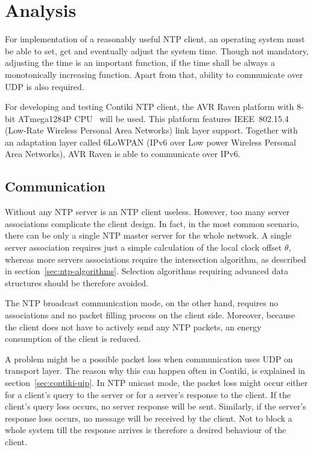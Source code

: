 
\chapter{Analysis}
For implementation of a reasonably useful NTP client,
an operating system must be able to set, get and eventually adjust the system time.
Though not mandatory, adjusting the time is an important function,
if the time shall be always a monotonically increasing function.
Apart from that, ability to communicate over UDP is also required.

For developing and testing Contiki NTP client,
the AVR Raven platform with 8-bit ATmega1284P CPU~\cite{avr-datasheet} will be used.
This platform features IEEE~802.15.4 (Low-Rate Wireless Personal Area Networks) link layer support.
Together with an adaptation layer called 6LoWPAN (IPv6 over Low power Wireless Personal Area Networks),
AVR Raven is able to communicate over IPv6.






\section{Communication}
Without any NTP server is an NTP client useless.
However, too many server associations complicate the client design.
In fact, in the most common scenario, there can be only a single NTP master server
for the whole network.
A single server association requires just a simple calculation of the local clock offset
$\theta$, whereas more servers associations require the intersection algorithm,
as described in section~\ref{sec:ntp-algorithms}.
Selection algorithms requiring advanced data structures should be therefore avoided.

The NTP broadcast communication mode, on the other hand,
requires no associations and no packet filling process on the client side.
Moreover, because the client does not have to actively send any NTP packets,
an energy consumption of the client is reduced.

A problem might be a possible packet loss when communication uses UDP on transport layer.
The reason why this can happen often in Contiki, is explained in section~\ref{sec:contiki-uip}.
In NTP unicast mode, the packet loss might occur either for a client's query to the server
or for a server's response to the client.
If the client's query loss occurs, no server response will be sent.
Similarly, if the server's response loss occurs, no message will be received by the client.
Not to block a whole system till the response arrives
is therefore a desired behaviour of the client.

